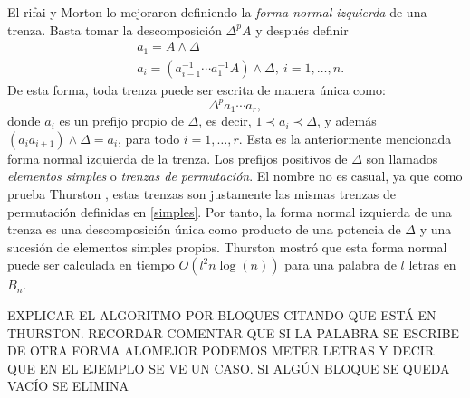 \documentclass[TFG.tex]{subfiles}
\begin{document}

El-rifai y Morton \cite{EM} lo mejoraron definiendo la \emph{forma normal izquierda} de una trenza. Basta tomar la descomposición $\Delta^pA$ y después definir %
\begin{align*}
&a_1=A\land\Delta\\
&a_i=(a_{i-1}^{-1}\cdots a_1^{-1}A)\land\Delta,\ i=1,\dots, n.
\end{align*}
De esta forma, toda trenza puede ser escrita de manera única como:
$$\Delta^p a_1\cdots a_r,$$
donde $a_i$ es un prefijo propio de $\Delta$, es decir, $1\prec a_i\prec\Delta$, y además $(a_ia_{i+1})\land\Delta=a_i$, para todo $i=1,\dots, r$. Esta es la anteriormente mencionada forma normal izquierda de la trenza. Los prefijos positivos de $\Delta$ son llamados \emph{elementos simples} o \emph{trenzas de permutación}. El nombre no es casual, ya que como prueba Thurston \cite{Thurston}, estas trenzas son justamente las mismas trenzas de permutación definidas en \ref{simples}. Por tanto, la forma normal izquierda de una trenza es una descomposición única como producto de una potencia de $\Delta$ y una sucesión de elementos simples propios. Thurston \cite{Thurston} mostró que esta forma normal puede ser calculada en tiempo $O(l^2n\log(n))$ para una palabra de $l$ letras en $B_n$. 


EXPLICAR EL ALGORITMO POR BLOQUES CITANDO QUE ESTÁ EN THURSTON. RECORDAR COMENTAR QUE SI LA PALABRA SE ESCRIBE DE OTRA FORMA ALOMEJOR PODEMOS METER LETRAS Y DECIR QUE EN EL EJEMPLO SE VE UN CASO. SI ALGÚN BLOQUE SE QUEDA VACÍO SE ELIMINA
\end{document}
